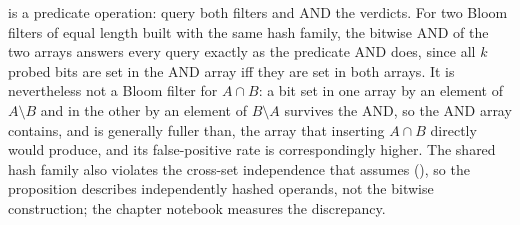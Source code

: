  is a predicate operation: query both filters
and AND the verdicts. For two Bloom filters of equal length built with the
same hash family, the bitwise AND of the two arrays answers every query
exactly as the predicate AND does, since all $k$ probed bits are set in the
AND array iff they are set in both arrays. It is nevertheless not a Bloom
filter for $A \cap B$: a bit set in one array by an element of $A \setminus
B$ and in the other by an element of $B \setminus A$ survives the AND, so the
AND array contains, and is generally fuller than, the array that inserting
$A \cap B$ directly would produce, and its false-positive rate is
correspondingly higher. The shared hash family also violates the cross-set
independence that  assumes
(), so the proposition describes
independently hashed operands, not the bitwise construction; the chapter
notebook measures the discrepancy.
